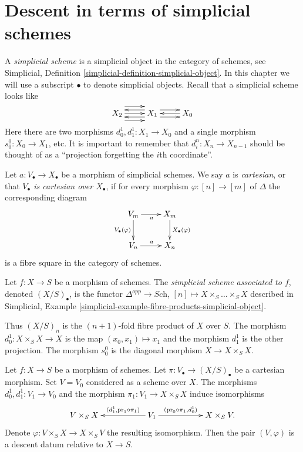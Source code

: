 \section{Descent in terms of simplicial schemes}
\label{section-simplicial}

\noindent
A {\it simplicial scheme} is a simplicial object in the category of schemes,
see Simplicial, Definition \ref{simplicial-definition-simplicial-object}.
In this chapter we will use a subscript $\bullet$ to denote simplicial
objects. Recall that a simplicial scheme looks like
$$
\xymatrix{
X_2
\ar@<2ex>[r]
\ar@<0ex>[r]
\ar@<-2ex>[r]
&
X_1
\ar@<1ex>[r]
\ar@<-1ex>[r]
\ar@<1ex>[l]
\ar@<-1ex>[l]
&
X_0
\ar@<0ex>[l]
}
$$
Here there are two morphisms $d^1_0, d^1_1 : X_1 \to X_0$
and a single morphism $s^0_0 : X_0 \to X_1$, etc.
It is important to remember that $d^n_i : X_n \to X_{n - 1}$
should be thought of as a ``projection forgetting the
$i$th coordinate''.

\begin{definition}
\label{definition-cartesian-morphism}
Let $a : V_\bullet \to X_\bullet$ be a morphism of simplicial schemes.
We say $a$ is {\it cartesian}, or that {\it $V_\bullet$ is cartesian over
$X_\bullet$}, if for every morphism
$\varphi : [n] \to [m]$ of $\Delta$ the corresponding diagram
$$
\xymatrix{
V_m \ar[r]_{a} \ar[d]_{V_\bullet(\varphi)} & X_m \ar[d]^{X_\bullet(\varphi)}\\
V_n \ar[r]^{a} & X_n
}
$$
is a fibre square in the category of schemes.
\end{definition}

\begin{definition}
\label{definition-fibre-products-simplicial-scheme}
Let $f : X \to S$ be a morphism of schemes.
The {\it simplicial scheme associated to $f$}, denoted $(X/S)_\bullet$,
is the functor $\Delta^{opp} \to \textit{Sch}$,
$[n] \mapsto X\times_S \ldots \times_S X$
described in
Simplicial, Example \ref{simplicial-example-fibre-products-simplicial-object}.
\end{definition}

\noindent
Thus $(X/S)_n$ is the $(n + 1)$-fold fibre product of $X$ over $S$.
The morphism $d^1_0 : X \times_S X \to X$ is the map
$(x_0, x_1) \mapsto x_1$ and the morphism $d^1_1$ is the other
projection. The morphism $s^0_0$ is the diagonal morphism
$X \to X \times_S X$.

\begin{lemma}
\label{lemma-cartesian-over}
Let $f : X \to S$ be a morphism of schemes.
Let $\pi : V_\bullet \to (X/S)_\bullet$ be a cartesian morphism.
Set $V = V_0$ considered as a scheme over $X$.
The morphisms $d^1_0, d^1_1 : V_1 \to V_0$ and the morphism
$\pi_1 : V_1 \to X \times_S X$ induce isomorphisms
$$
\xymatrix{
V \times_S X & &
V_1 \ar[ll]_-{(d^1_1, \text{pr}_1 \circ \pi_1)}
\ar[rr]^-{(\text{pr}_0 \circ \pi_1, d^1_0)} & &
X \times_S V.
}
$$
Denote $\varphi : V \times_S X \to X \times_S V$ the
resulting isomorphism.
Then the pair $(V, \varphi)$ is a descent datum relative
to $X \to S$.
\end{lemma}

